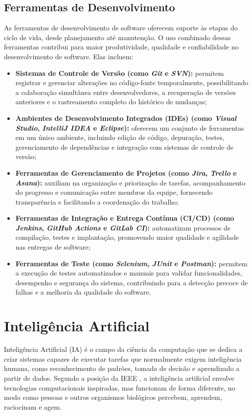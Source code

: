 \subsection{Ferramentas de Desenvolvimento}

As ferramentas de desenvolvimento de software oferecem suporte às etapas do ciclo de vida, desde planejamento até manutenção. O uso combinado dessas ferramentas contribui para maior produtividade, qualidade e confiabilidade no desenvolvimento de software. Elas incluem:

\begin{itemize}
    \item \textbf{Sistemas de Controle de Versão (como \emph{Git} e \emph{SVN}):} permitem registrar e gerenciar alterações no código-fonte temporalmente, possibilitando a colaboração simultânea entre desenvolvedores, a recuperação de versões anteriores e o rastreamento completo do histórico de mudanças;

    \item \textbf{Ambientes de Desenvolvimento Integrados (IDEs) (como \emph{Visual Studio}, \emph{IntelliJ IDEA} e \emph{Eclipse}):} oferecem um conjunto de ferramentas em um único ambiente, incluindo edição de código, depuração, testes, gerenciamento de dependências e integração com sistemas de controle de versão;

    \item \textbf{Ferramentas de Gerenciamento de Projetos (como \emph{Jira}, \emph{Trello} e \emph{Asana}):} auxiliam na organização e priorização de tarefas, acompanhamento do progresso e comunicação entre membros da equipe, fornecendo transparência e facilitando a coordenação do trabalho;

    \item \textbf{Ferramentas de Integração e Entrega Contínua (CI/CD) (como \emph{Jenkins}, \emph{GitHub Actions} e \emph{GitLab CI}):} automatizam processos de compilação, testes e implantação, promovendo maior qualidade e agilidade nas entregas de software;

    \item \textbf{Ferramentas de Teste (como \emph{Selenium}, \emph{JUnit} e \emph{Postman}):} permitem a execução de testes automatizados e manuais para validar funcionalidades, desempenho e segurança do sistema, contribuindo para a detecção precoce de falhas e a melhoria da qualidade do software.
\end{itemize}

\section{Inteligência Artificial}
Inteligência Artificial (IA) é o campo da ciência da computação que se dedica a criar sistemas capazes de executar tarefas que normalmente exigem inteligência humana, como reconhecimento de padrões, tomada de decisão e aprendizado a partir de dados. Segundo a posição da IEEE \citep{ieee2019ai}, a inteligência artificial envolve tecnologias computacionais inspiradas, mas funcionam de forma diferente, no modo como pessoas e outros organismos biológicos percebem, aprendem, raciocinam e agem.

